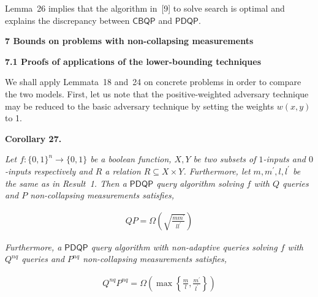 \documentclass[10pt,a4paper]{article}
\begin{document}



Lemma 26 implies that the algorithm in [9] to solve search is optimal and explains the discrepancy between $\mathsf{CBQP}$ and $\mathsf{PDQP}$.\par







\par\medskip\noindent\textbf{
7 Bounds on problems with non-collapsing measurements}\par




\par\medskip\noindent\textbf{
7.1 Proofs of applications of the lower-bounding techniques}\par




We shall apply Lemmata 18 and 24 on concrete problems in order to compare the two models. First, let us note that the positive-weighted adversary technique may be reduced to the basic adversary technique by setting the weights $w(x,y)$ to 1.\par





\par\medskip\noindent\textbf{
\textbf{Corollary 27}\textbf{.}
}\par



\emph{Let $f:\{0,1\}^{n}\rightarrow\{0,1\}$ be a boolean function, $X,Y$ be two subsets of $1$-inputs and $0$-inputs respectively and $R$ a relation $R\subseteq X\times Y$. Furthermore, let $m,m^{\prime},l,l^{\prime}$ be the same as in Result 1. Then a $\mathsf{PDQP}$ query algorithm solving $f$ with $Q$ queries and $P$ non-collapsing measurements satisfies,}\par


\[\begin{gathered}
\displaystyle QP=\Omega\left(\sqrt{\frac{mm^{\prime}}{ll^{\prime}}}\right)
\end{gathered}\]


\emph{Furthermore, a $\mathsf{PDQP}$ query algorithm with non-adaptive queries solving $f$ with $Q^{nq}$ queries and $P^{nq}$ non-collapsing measurements satisfies,}\par


\[\begin{gathered}
\displaystyle Q^{nq}P^{nq}=\Omega\left(\max\left\{\frac{m}{l},\frac{m^{\prime}}{l^{\prime}}\right\}\right)
\end{gathered}\]
\end{document}
